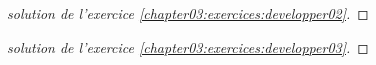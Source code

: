 \documentclass[main.tex]{subfiles}
\begin{document}
%	 
\newpage 
\begin{proof}[solution de l'exercice \ref{chapter03:exercices:developper02}]
	
\end{proof}
\begin{proof}[solution de l'exercice \ref{chapter03:exercices:developper03}]

\end{proof}
%	 
\newpage  
{}  
\pagestyle{scrheadings} %
\onehalfspacing 
\end{document}
